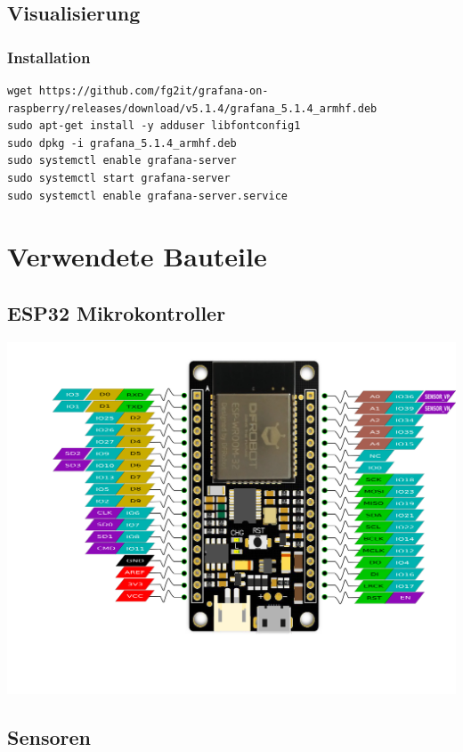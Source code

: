 \documentclass[
  12pt, %
  a4paper, %
  twoside, %
  openany, %
  numbers=noenddot, %
  BCOR=5mm, %
  parskip=half*, %
  thesis, %
]{bfhbook}
\begin{document}
\section{Visualisierung}
\subsection{Installation}
    \begin{verbatim}
wget https://github.com/fg2it/grafana-on-raspberry/releases/download/v5.1.4/grafana_5.1.4_armhf.deb
sudo apt-get install -y adduser libfontconfig1
sudo dpkg -i grafana_5.1.4_armhf.deb
sudo systemctl enable grafana-server
sudo systemctl start grafana-server
sudo systemctl enable grafana-server.service
   \end{verbatim}
\chapter{Verwendete Bauteile}
\section{ESP32 Mikrokontroller}
\begin{center}
    \includegraphics[width=14cm, left]{Bilder/FireBeetleBoard.png}
    \captionsetup{justification=raggedright}
\end{center}
 \section{Sensoren}
\end{document}
